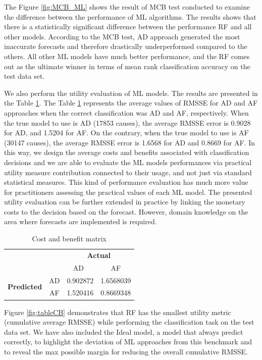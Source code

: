 \documentclass[]{elsarticle} %
\begin{document}
The Figure \ref{fig:MCB_ML} shows the result of MCB test conducted to
examine the difference between the performance of ML algorithms. The
results shows that there is a statistically significant difference
between the performance RF and all other models. According to the MCB
test, AD approach generated the most inaccurate forecasts and therefore
drastically underperformed compared to the others. All other ML models
have much better performance, and the RF comes out as the ultimate
winner in terms of mean rank classification accuracy on the test data
set.

We also perform the utility evaluation of ML models. The results are
presented in the Table \ref{tab:matrix}. The Table \ref{tab:matrix}
represents the average values of RMSSE for AD and AF approaches when the
correct classification was AD and AF, respectively. When the true model
to use is AD (17853 causes), the average RMSSE error is 0.9028 for AD,
and 1.5204 for AF. On the contrary, when the true model to use is AF
(30147 causes), the average RMSSE error is 1.6568 for AD and 0.8669 for
AF. In this way, we design the average costs and benefits associated
with classification decisions and we are able to evaluate the ML models
performances via practical utility measure contribution connected to
their usage, and not just via standard statistical measures. This kind
of performance evaluation has much more value for practitioners
assessing the practical values of each ML model. The presented utility
evaluation can be further extended in practice by linking the monetary
costs to the decision based on the forecast. However, domain knowledge
on the area where forecasts are implemented is required.

\begin{table}
\caption{\label{tab:matrix}Cost and benefit matrix}
\centering
\begin{tabular}[t]{lccc}

\multicolumn{2}{c}{} & \multicolumn{2}{c}{\bf Actual}\\ 
\cline{3-4}
& & AD\  & AF\\
\hline
\multirow{2}{4em}{\bf Predicted} & AD & 0.902872 & 1.6568039\\
& AF & 1.520416 & 0.8669348\\
\hline
\end{tabular}
\end{table}

Figure \ref{fig:tableCB} demonstrates that RF has the smallest utility
metric (cumulative average RMSSE) while performing the classification
task on the test data set. We have also included the Ideal model, a
model that always predict correctly, to highlight the deviation of ML
approaches from this benchmark and to reveal the max possible margin for
reducing the overall cumulative RMSSE.
\end{document}
